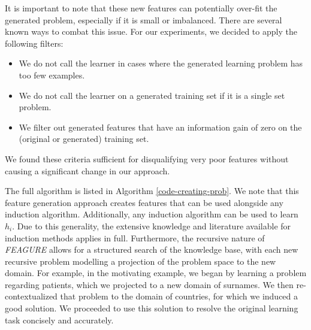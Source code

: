 \documentclass[twoside,11pt]{article}
\theoremstyle{definition}
\begin{document}
It is important to note that these new features can potentially over-fit the generated problem, especially if it is small or imbalanced. There are several known ways to combat this issue. For our experiments, we decided to apply the following filters:
\begin{itemize}
	\item We do not call the learner in cases where the generated learning problem has too few examples.
	\item We do not call the learner on a generated training set if it is a single set problem.
	\item We filter out generated features that have an information gain of zero on the (original or generated) training set.
\end{itemize}  

We found these criteria sufficient for disqualifying very poor features without causing a significant change in our approach.


The full algorithm is listed in Algorithm \ref{code-creating-prob}.
We note that this feature generation approach creates features that can be used alongside any induction algorithm. Additionally, any induction algorithm can be used to learn $h_i$. Due to this generality, the extensive knowledge and literature available for induction methods applies in full. Furthermore, the recursive nature of \emph{FEAGURE} allows for a structured search of the knowledge base, with each new recursive problem modelling a projection of the problem space to the new domain. For example, in the motivating example, we began by learning a problem regarding patients, which we projected to a new domain of surnames. We then re-contextualized that problem to the domain of countries, for which we induced a good solution. We proceeded to use this solution to resolve the original learning task concisely and accurately.
\end{document}

